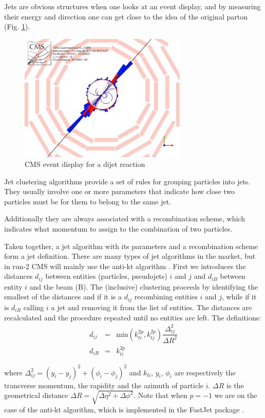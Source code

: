 Jets are obvious structures when one looks at an event display,
and by measuring their energy and direction one can get close to
the idea of the original parton (Fig. \ref{jet2figure}).
\begin{figure}[H]
  \centering
\includegraphics[width=8cm]{physics_objects_plots/Jet2}
\caption{CMS event display for a dijet reaction \label{jet2figure}}
\end{figure}

Jet clustering algorithms provide a set of rules for grouping particles into jets. They usually involve one or more parameters that indicate how close two particles must be for them to belong to the same jet.

Additionally they are always associated with a recombination scheme, which indicates what momentum to assign to the combination of two particles.

Taken together, a jet algorithm with its parameters and a recombination scheme form a jet definition.
There are many types of jet algorithms in the market, but in run-2 CMS will mainly use the anti-kt algorithm \cite{antikt}.
First we introduces the distances $d_{ij}$ between entities (particles, pseudojets) $i$ and $j$ and $d_{iB}$ between entity
$i$ and the beam (B). The (inclusive) clustering proceeds by identifying the smallest of the distances and if it is a $d_{ij}$ recombining entities $i$ and $j$, while if it is $d_{iB}$ calling
$i$ a jet and removing it from the list of entities. The distances are recalculated and the procedure repeated until no entities are left. The definitions:
\begin{eqnarray}
d_{ij} &=& \text{min}\left(k^{2p}_{ti},k^{2p}_{tj} \right) \dfrac{\Delta^{2}_{ij}}{\Delta R^{2}}\\
d_{iB} &=& k^{2p}_{ti}
\end{eqnarray}

where $\Delta^{2}_{ij}= (y_{i}-y_{j})^{2}+(\phi_{i}-\phi_{j})^{2}$ and $k_{ti}$, $y_{i}$, $\phi_{i}$ are respectively the transverse momentum, the rapidity and the azimuth of particle $i$. $\Delta R$ is the geometrical distance $\Delta R=\sqrt{\Delta\eta^{2} + \Delta\phi^{2}}$. Note that when $p=-1$ we are on the case of  the anti-kt algorithm, which is implemented in the FastJet package \cite{fastjet}.

